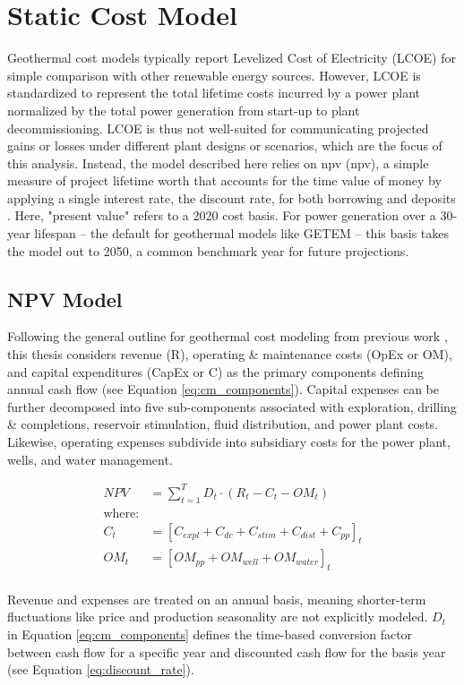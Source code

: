 \section{Static Cost Model}
\label{ch4:cm_structure}

Geothermal cost models typically report Levelized Cost of Electricity (LCOE) for simple comparison with other renewable energy sources. However, LCOE is standardized to represent the total lifetime costs incurred by a power plant normalized by the total power generation from start-up to plant decommissioning. LCOE is thus not well-suited for communicating projected gains or losses under different plant designs or scenarios, which are the focus of this analysis. Instead, the model described here relies on \acrlong{npv} (\acrshort{npv}), a simple measure of project lifetime worth that accounts for the time value of money by applying a single interest rate, the discount rate, for both borrowing and deposits \citep[p.\ 195-215]{de_neufville_flexibility_2011}. Here, "present value" refers to a 2020 cost basis. For power generation over a 30-year lifespan -- the default for geothermal models like GETEM \citep{entingh_volume_2006} -- this basis takes the model out to 2050, a common benchmark year for future projections. 

\subsection{NPV Model}
\label{ch4:cm_npv}
Following the general outline for geothermal cost modeling from previous work \citep[e.g.,][]{augustine_hydrothermal_2009, beckers_introducing_2013,tester_future_2006}, this thesis considers revenue (R), operating \& maintenance costs (OpEx or OM), and capital expenditures (CapEx or C) as the primary components defining annual cash flow (see Equation \ref{eq:cm_components}). Capital expenses can be further decomposed into five  sub-components associated with exploration, drilling \& completions, reservoir stimulation, fluid distribution, and power plant costs. Likewise, operating expenses subdivide into subsidiary costs for the power plant, wells, and water management.

\begin{equation}
    \label{eq:cm_components}
    \begin{aligned}
    NPV &= \sum_{t=1}^{T}D_t \cdot \left( R_t - C_t - OM_t \right)\\
    \text{where:}\\
    C_t &= \left[C_{expl} + C_{dc} + C_{stim} + C_{dist} + C_{pp}\right]_t\\
    OM_t &= \left[OM_{pp} + OM_{well} + OM_{water}\right]_t
    \end{aligned}
\end{equation}
\\
Revenue and expenses are treated on an annual basis, meaning shorter-term fluctuations like price and production seasonality are not explicitly modeled. $D_t$ in Equation \ref{eq:cm_components} defines the time-based conversion factor between cash flow for a specific year and discounted cash flow for the basis year (see Equation \ref{eq:discount_rate}).

